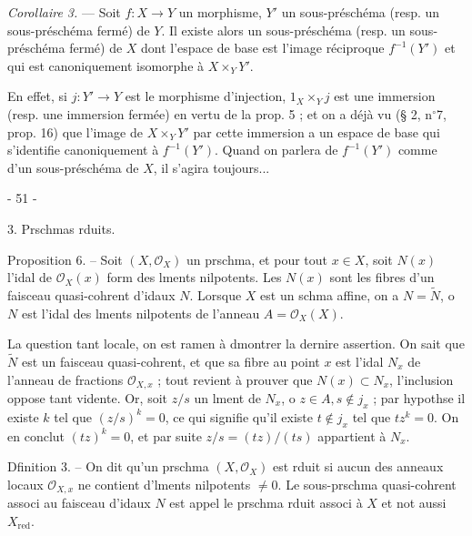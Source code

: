 \emph{Corollaire 3.} — Soit $f : X \to Y$ un morphisme, $Y'$ un sous-préschéma (resp. un sous-préschéma fermé) de $Y$. Il existe alors un sous-préschéma (resp. un sous-préschéma fermé) de $X$ dont l'espace de base est l'image réciproque $f^{-1}(Y')$ et qui est canoniquement isomorphe à $X \times_Y Y'$.

En effet, si $j : Y' \to Y$ est le morphisme d'injection, $1_X \times_Y j$ est une immersion (resp. une immersion fermée) en vertu de la prop. 5 ; et on a déjà vu (§ 2, n$^\circ$7, prop. 16) que l'image de $X \times_Y Y'$ par cette immersion a un espace de base qui s'identifie canoniquement à $f^{-1}(Y')$. Quand on parlera de $f^{-1}(Y')$ comme d'un sous-préschéma de $X$, il s'agira toujours...

\newpage


- 51 -

3. Prschmas rduits.

Proposition 6. -- Soit $(X, \mathcal{O}_X)$ un prschma, et pour tout $x \in X$, soit $N(x)$ l'idal de $\mathcal{O}_X(x)$ form des lments nilpotents. Les $N(x)$ sont les fibres d'un faisceau quasi-cohrent d'idaux $N$. Lorsque $X$ est un schma affine, on a $N = \tilde{N}$, o $N$ est l'idal des lments nilpotents de l'anneau $A = \mathcal{O}_X(X)$.

La question tant locale, on est ramen \`a dmontrer la dernire assertion. On sait que $\tilde{N}$ est un faisceau quasi-cohrent, et que sa fibre au point $x$ est l'idal $N_x$ de l'anneau de fractions $\mathcal{O}_{X,x}$ ; tout revient \`a prouver que $N(x) \subset N_x$, l'inclusion oppose tant vidente. Or, soit $z/s$ un lment de $N_x$, o $z \in A, s \notin j_x$ ; par hypothse il existe $k$ tel que $(z/s)^k = 0$, ce qui signifie qu'il existe $t \notin j_x$ tel que $tz^k = 0$. On en conclut $(tz)^k = 0$, et par suite $z/s = (tz)/(ts)$ appartient \`a $N_x$.

Dfinition 3. -- On dit qu'un prschma $(X, \mathcal{O}_X)$ est rduit si aucun des anneaux locaux $\mathcal{O}_{X,x}$ ne contient d'lments nilpotents $\neq 0$. Le sous-prschma quasi-cohrent associ au faisceau d'idaux $N$ est appel le prschma rduit associ \`a $X$ et not aussi $X_{\text{red}}$.

